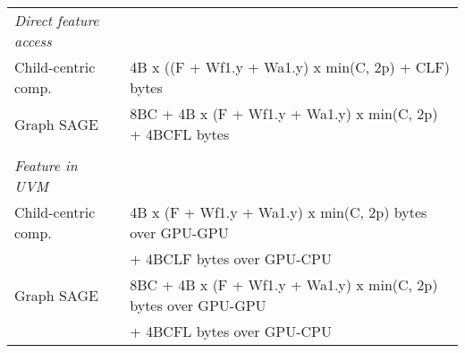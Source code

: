 \documentclass[10pt,oneside]{memoir}
\begin{document}
\begin{longtable}[]{@{}ll@{}}
\begin{minipage}[t]{0.57\columnwidth}
\emph{Direct feature access}\strut
\end{minipage} & \begin{minipage}[t]{0.37\columnwidth}\raggedright
\strut
\end{minipage}\tabularnewline
\begin{minipage}[t]{0.57\columnwidth}\raggedright
Child-centric comp.\strut
\end{minipage} & \begin{minipage}[t]{0.37\columnwidth}\raggedright
4B x ((F + Wf1.y + Wa1.y) x min(C, 2p) + CLF) bytes\strut
\end{minipage}\tabularnewline
\begin{minipage}[t]{0.57\columnwidth}\raggedright
Graph SAGE\strut
\end{minipage} & \begin{minipage}[t]{0.37\columnwidth}\raggedright
8BC + 4B x (F + Wf1.y + Wa1.y) x min(C, 2p) + 4BCFL bytes\strut
\end{minipage}\tabularnewline
\begin{minipage}[t]{0.57\columnwidth}\raggedright
\strut
\end{minipage} & \begin{minipage}[t]{0.37\columnwidth}\raggedright
\strut
\end{minipage}\tabularnewline
\begin{minipage}[t]{0.57\columnwidth}\raggedright
\emph{Feature in UVM}\strut
\end{minipage} & \begin{minipage}[t]{0.37\columnwidth}\raggedright
\strut
\end{minipage}\tabularnewline
\begin{minipage}[t]{0.57\columnwidth}\raggedright
Child-centric comp.\strut
\end{minipage} & \begin{minipage}[t]{0.37\columnwidth}\raggedright
4B x (F + Wf1.y + Wa1.y) x min(C, 2p) bytes over GPU-GPU\strut
\end{minipage}\tabularnewline
\begin{minipage}[t]{0.57\columnwidth}\raggedright
\strut
\end{minipage} & \begin{minipage}[t]{0.37\columnwidth}\raggedright
+ 4BCLF bytes over GPU-CPU\strut
\end{minipage}\tabularnewline
\begin{minipage}[t]{0.57\columnwidth}\raggedright
Graph SAGE\strut
\end{minipage} & \begin{minipage}[t]{0.37\columnwidth}\raggedright
8BC + 4B x (F + Wf1.y + Wa1.y) x min(C, 2p) bytes over GPU-GPU\strut
\end{minipage}\tabularnewline
\begin{minipage}[t]{0.57\columnwidth}\raggedright
\strut
\end{minipage} & \begin{minipage}[t]{0.37\columnwidth}\raggedright
+ 4BCFL bytes over GPU-CPU\strut
\end{minipage}\tabularnewline
\bottomrule
\end{longtable}
\end{document}
